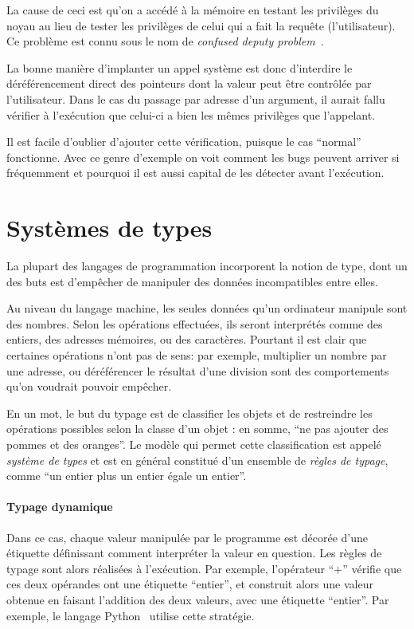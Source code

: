 La cause de ceci est qu'on a accédé à la mémoire en testant les privilèges du
noyau au lieu de tester les privilèges de celui qui a fait la requête
(l'utilisateur). Ce problème est connu sous le nom de \emph{confused deputy
problem}~\cite{hardy88confused}.

La bonne manière d'implanter un appel système est donc d'interdire le
déréférencement direct des pointeurs dont la valeur peut être contrôlée par
l'utilisateur. Dans le cas du passage par adresse d'un argument, il aurait fallu
vérifier à l'exécution que celui-ci a bien les mêmes privilèges que l'appelant.

Il est facile d'oublier d'ajouter cette vérification, puisque le cas ``normal''
fonctionne. Avec ce genre d'exemple on voit comment les bugs peuvent arriver si
fréquemment et pourquoi il est aussi capital de les détecter avant l'exécution.

\section{Systèmes de types}
\label{sec:types-intro}

La plupart des langages de programmation incorporent la notion de type, dont un
des buts est d'empêcher de manipuler des données incompatibles entre elles.

Au niveau du langage machine, les seules données qu'un ordinateur manipule sont
des nombres. Selon les opérations effectuées, ils seront interprétés comme des
entiers, des adresses mémoires, ou des caractères. Pourtant il est clair que
certaines opérations n'ont pas de sens: par exemple, multiplier un nombre par
une adresse, ou déréférencer le résultat d'une division sont des comportements
qu'on voudrait pouvoir empêcher.

En un mot, le but du typage est de classifier les objets et de restreindre les
opérations possibles selon la classe d'un objet : en somme, ``ne pas ajouter des
pommes et des oranges''. Le modèle qui permet cette classification est appelé
\emph{système de types} et est en général constitué d'un ensemble de
\emph{règles de typage}, comme ``un entier plus un entier égale un entier''.

\paragraph{Typage dynamique}

Dans ce cas, chaque valeur manipulée par le programme est décorée d'une
étiquette définissant comment interpréter la valeur en question. Les règles de
typage sont alors réalisées à l'exécution. Par exemple, l'opérateur ``$+$''
vérifie que ces deux opérandes ont une étiquette ``entier'', et construit alors
une valeur obtenue en faisant l'addition des deux valeurs, avec une étiquette
``entier''. Par exemple, le langage Python~ utilise cette
stratégie.


